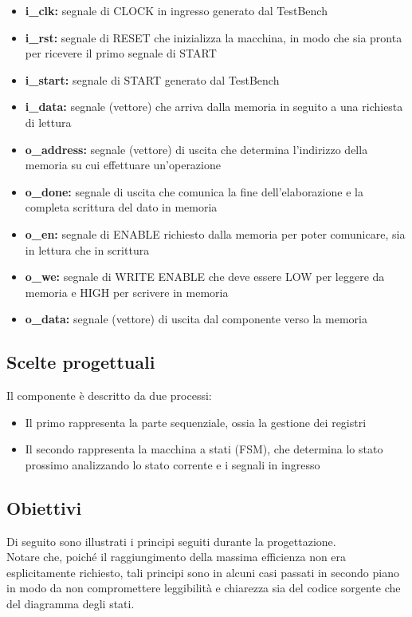 \documentclass[a4paper, 12pt]{article}
\begin{document}
\begin{itemize}
    \item \textbf{i\_clk:} segnale di CLOCK in ingresso generato dal TestBench
    \item \textbf{i\_rst:} segnale di RESET che inizializza la macchina, in modo che sia pronta per ricevere il primo segnale di START
    \item \textbf{i\_start:} segnale di START generato dal TestBench
    \item \textbf{i\_data:} segnale (vettore) che arriva dalla memoria in seguito a una richiesta di lettura
    \item \textbf{o\_address:} segnale (vettore) di uscita che determina l’indirizzo della memoria su cui effettuare un'operazione
    \item \textbf{o\_done:} segnale di uscita che comunica la fine dell’elaborazione e la completa scrittura del dato in memoria
    \item \textbf{o\_en:} segnale di ENABLE richiesto dalla memoria per poter comunicare, sia in lettura che in scrittura
    \item \textbf{o\_we:} segnale di WRITE ENABLE che deve essere LOW per leggere da memoria e HIGH per scrivere in memoria
    \item \textbf{o\_data:} segnale (vettore) di uscita dal componente verso la memoria
\end{itemize}

\subsection{Scelte progettuali}
Il componente è descritto da due processi:
\begin{itemize}
    \item Il primo rappresenta la parte sequenziale, ossia la gestione dei registri
    \item Il secondo rappresenta la macchina a stati (FSM), che determina lo stato prossimo analizzando lo stato corrente e i segnali in ingresso
\end{itemize}

\subsection{Obiettivi}
Di seguito sono illustrati i principi seguiti durante la progettazione. \\
Notare che, poiché il raggiungimento della massima efficienza non era esplicitamente richiesto, tali principi sono in alcuni casi passati in secondo piano in modo da non compromettere leggibilità e chiarezza sia del codice sorgente che del diagramma degli stati.
\end{document}
